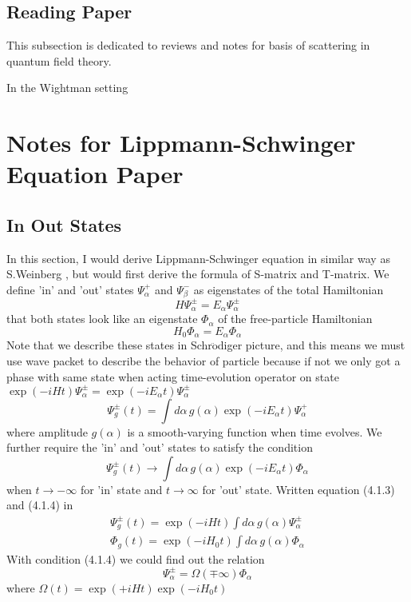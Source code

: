 \documentclass[12pt]{article}
\numberwithin{equation}{subsection}
\begin{document}
\subsection{Reading Paper}
This subsection is dedicated to reviews and notes for basis of scattering in quantum field theory\cite{Buchholz:2005sa}.

In the Wightman setting\cite{streater1964ptc}
\section{Notes for Lippmann-Schwinger Equation Paper}
\subsection{In Out States}
In this section, I would derive Lippmann-Schwinger equation in similar way as S.Weinberg \cite{Weinberg_2015}, but would first derive the formula of S-matrix and T-matrix.
We define 'in' and 'out' states $\Psi_{\alpha}^{+}$ and $\Psi_{\beta}^{-}$ as eigenstates of the total Hamiltonian
\begin{equation}
    H\Psi_{\alpha}^{\pm} = E_{\alpha}\Psi_{\alpha}^{\pm}
\end{equation}
that both states look like an eigenstate $\Phi_{\alpha}$ of the free-particle Hamiltonian
\begin{equation}
    H_0\Phi_{\alpha} = E_{\alpha}\Phi_{\alpha}
\end{equation}
Note that we describe these states in Schr$\ddot{\text{o}}$diger picture, and this means we must use wave packet to describe the behavior of particle because if not we only got a phase with same state when acting time-evolution operator on state $\exp(-iHt)\Psi_{\alpha}^{\pm} = \exp(-iE_{\alpha}t)\Psi_{\alpha}^{\pm}$
\begin{equation}
    \Psi_{g}^{\pm}(t) = \int{d\alpha\,g(\alpha)\exp(-iE_{\alpha}t)\Psi_{\alpha}^{+}}
\end{equation}
where amplitude $g(\alpha)$ is a smooth-varying function when time evolves.
We further require the 'in' and 'out' states to satisfy the condition
\begin{equation}
    \Psi_{g}^{\pm}(t)\rightarrow \int{d\alpha\,g(\alpha)\exp(-iE_{\alpha}t)\Phi_{\alpha}}
\end{equation}
when $t\rightarrow-\infty$ for 'in' state and $t\rightarrow\infty$ for 'out' state.
Written equation (4.1.3) and (4.1.4) in 
\begin{equation}
    \begin{split}
        \Psi_{g}^{\pm}(t) = \exp(-iHt)\int{d\alpha\,g(\alpha)\Psi_{\alpha}^{\pm}}\\
        \Phi_{g}(t) = \exp(-iH_0t)\int{d\alpha\,g(\alpha)\Phi_{\alpha}}
    \end{split}
\end{equation}
With condition (4.1.4) we could find out the relation
\begin{equation}
    \Psi_{\alpha}^{\pm} = \Omega(\mp\infty)\Phi_{\alpha}
\end{equation}
where $\Omega(t) = \exp(+iHt)\exp(-iH_0t)$
\end{document}
